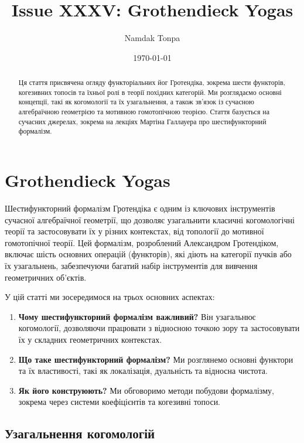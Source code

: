 \documentclass{article}
\title{Issue XXXV: Grothendieck Yogas}
\author{Namdak Tonpa}
\date{\today}
\theoremstyle{plain}
\theoremstyle{definition}
\begin{document}
\maketitle

\begin{abstract}
Ця стаття присвячена огляду функторіальних йог Гротендіка, зокрема шести функторів, когезивних топосів та їхньої ролі в теорії похідних категорій. Ми розглядаємо основні концепції, такі як когомології та їх узагальнення, а також зв’язок із сучасною алгебраїчною геометрією та мотивною гомотопічною теорією. Стаття базується на сучасних джерелах, зокрема на лекціях Мартіна Галлауера про шестифункторний формалізм.
\end{abstract}

\ifincludeTOC
  \tableofcontents
\fi

\section{Grothendieck Yogas}

Шестифункторний формалізм Гротендіка є одним із ключових інструментів сучасної алгебраїчної геометрії, що дозволяє узагальнити класичні когомологічні теорії та застосовувати їх у різних контекстах, від топології до мотивної гомотопічної теорії. Цей формалізм, розроблений Александром Гротендіком, включає шість основних операцій (функторів), які діють на категорії пучків або їх узагальнень, забезпечуючи багатий набір інструментів для вивчення геометричних об’єктів.

У цій статті ми зосередимося на трьох основних аспектах:
\begin{enumerate}
    \item \textbf{Чому шестифункторний формалізм важливий?} Він узагальнює когомології, дозволяючи працювати з відносною точкою зору та застосовувати їх у складних геометричних контекстах.
    \item \textbf{Що таке шестифункторний формалізм?} Ми розглянемо основні функтори та їх властивості, такі як локалізація, дуальність та відносна чистота.
    \item \textbf{Як його конструюють?} Ми обговоримо методи побудови формалізму, зокрема через системи коефіцієнтів та когезивні топоси.
\end{enumerate}

\subsection{Узагальнення когомологій}
\end{document}
